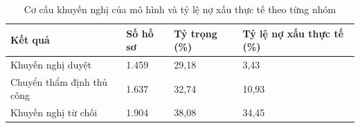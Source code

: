 \begin{table}[!htbp]
\centering
\caption{Cơ cấu khuyến nghị của mô hình và tỷ lệ nợ xấu thực tế theo từng nhóm}
\label{tab:decision-mix}
\small
\setlength{\tabcolsep}{5.0pt}
\begin{tabular}{@{}L{5.854cm}R{2.537cm}R{2.537cm}R{3.317cm}@{}}
\toprule
\textbf{Kết quả} & \textbf{Số hồ sơ} & \textbf{Tỷ trọng (\%)} & \textbf{Tỷ lệ nợ xấu thực tế (\%)} \\
\midrule
Khuyến nghị duyệt & 1.459 & 29,18 & 3,43 \\
Chuyển thẩm định thủ công & 1.637 & 32,74 & 10,93 \\
Khuyến nghị từ chối & 1.904 & 38,08 & 34,45 \\
\bottomrule
\end{tabular}
\end{table}
